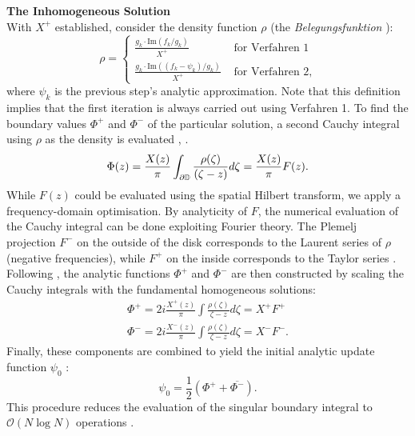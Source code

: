 \bigskip\noindent\textbf{The Inhomogeneous Solution}\\
With $X^+$ established, consider the density function $\rho$ (the \textit{Belegungsfunktion} \cite[§5]{Wegmann1984_convergence_iterative_method}):
\begin{equation}
    \rho =
    \begin{cases}
        \frac{g_k \cdot \text{Im}(f_k /g_k)}{X^+} & \text{ for Verfahren 1} \\
        \frac{g_k \cdot \text{Im}((f_k - \psi_k)/g_k)}{X^+} & \text{ for Verfahren 2},
    \end{cases}
\end{equation}
where $\psi_k$ is the previous step's analytic approximation. Note that this definition implies that the first iteration is always carried out using Verfahren 1.
To find the boundary values $\Phi^+$ and $\Phi^-$ of the particular solution, a second Cauchy integral using $\rho$ as the density is evaluated \cite[Eq. 3.7]{Wegmann1978_newtonverfahren}, \cite[Eq. 40.24]{Muskhelishvili1977}.
\begin{equation}
    \Phi(z) = \frac{X(z)}{\pi} \displaystyle\int_{\partial\mathbb{D}} \frac{\rho(\zeta)}{(\zeta-z)} d\zeta = \frac{X(z)}{\pi}F(z).
\end{equation}
While $F(z)$ could be evaluated using the spatial Hilbert transform, we apply a frequency-domain optimisation.
By analyticity of $F$, the numerical evaluation of the Cauchy integral can be done exploiting Fourier theory. The Plemelj projection $F^-$ on the outside of the disk corresponds to the Laurent series of $\rho$ (negative frequencies), while $F^+$ on the inside corresponds to the Taylor series \cite[Eq. 14.2-31, 14.2-32]{Henrici1986_vol3}.
Following \cite[Eq. 3.7 and p.464]{Wegmann1978_newtonverfahren}, the analytic functions $\Phi^+$ and $\Phi^-$ are then constructed by scaling the Cauchy integrals with the fundamental homogeneous solutions:
\begin{equation}
    \begin{matrix}
         \Phi^+ = 2i \frac{X^+(z)}{\pi}\int \frac{\rho(\zeta)}{\zeta - z} d\zeta = X^+ F^+ \\
         \Phi^- = 2i \frac{X^-(z)}{\pi}\int \frac{\rho(\zeta)}{\zeta - z} d\zeta = X^- F^-.
    \end{matrix}
\end{equation}
Finally, these components are combined to yield the initial analytic update function $\psi_0$ \cite[Eq. 3.8]{Wegmann1978_newtonverfahren}:
\begin{equation}
    \psi_0 = \frac{1}{2} \left( \Phi^+ + \overline{\Phi^-} \right).
\end{equation}
This procedure reduces the evaluation of the singular boundary integral to $\mathcal{O}(N\log N)$ operations \cite[page 109]{Henrici1986_vol3}.

